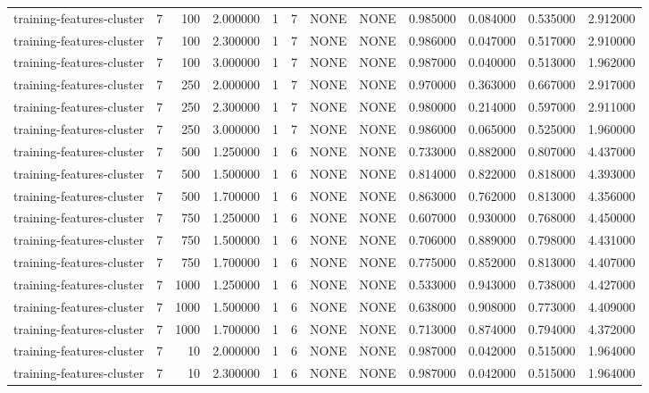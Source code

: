 \begin{tabular}{lrrrllllrrrr}
training-features-cluster & 7 & 100 & 2.000000 & 1 & 7 & NONE & NONE & 0.985000 & 0.084000 & 0.535000 & 2.912000 \\
training-features-cluster & 7 & 100 & 2.300000 & 1 & 7 & NONE & NONE & 0.986000 & 0.047000 & 0.517000 & 2.910000 \\
training-features-cluster & 7 & 100 & 3.000000 & 1 & 7 & NONE & NONE & 0.987000 & 0.040000 & 0.513000 & 1.962000 \\
training-features-cluster & 7 & 250 & 2.000000 & 1 & 7 & NONE & NONE & 0.970000 & 0.363000 & 0.667000 & 2.917000 \\
training-features-cluster & 7 & 250 & 2.300000 & 1 & 7 & NONE & NONE & 0.980000 & 0.214000 & 0.597000 & 2.911000 \\
training-features-cluster & 7 & 250 & 3.000000 & 1 & 7 & NONE & NONE & 0.986000 & 0.065000 & 0.525000 & 1.960000 \\
training-features-cluster & 7 & 500 & 1.250000 & 1 & 6 & NONE & NONE & 0.733000 & 0.882000 & 0.807000 & 4.437000 \\
training-features-cluster & 7 & 500 & 1.500000 & 1 & 6 & NONE & NONE & 0.814000 & 0.822000 & 0.818000 & 4.393000 \\
training-features-cluster & 7 & 500 & 1.700000 & 1 & 6 & NONE & NONE & 0.863000 & 0.762000 & 0.813000 & 4.356000 \\
training-features-cluster & 7 & 750 & 1.250000 & 1 & 6 & NONE & NONE & 0.607000 & 0.930000 & 0.768000 & 4.450000 \\
training-features-cluster & 7 & 750 & 1.500000 & 1 & 6 & NONE & NONE & 0.706000 & 0.889000 & 0.798000 & 4.431000 \\
training-features-cluster & 7 & 750 & 1.700000 & 1 & 6 & NONE & NONE & 0.775000 & 0.852000 & 0.813000 & 4.407000 \\
training-features-cluster & 7 & 1000 & 1.250000 & 1 & 6 & NONE & NONE & 0.533000 & 0.943000 & 0.738000 & 4.427000 \\
training-features-cluster & 7 & 1000 & 1.500000 & 1 & 6 & NONE & NONE & 0.638000 & 0.908000 & 0.773000 & 4.409000 \\
training-features-cluster & 7 & 1000 & 1.700000 & 1 & 6 & NONE & NONE & 0.713000 & 0.874000 & 0.794000 & 4.372000 \\
training-features-cluster & 7 & 10 & 2.000000 & 1 & 6 & NONE & NONE & 0.987000 & 0.042000 & 0.515000 & 1.964000 \\
training-features-cluster & 7 & 10 & 2.300000 & 1 & 6 & NONE & NONE & 0.987000 & 0.042000 & 0.515000 & 1.964000 \\

\end{tabular}

